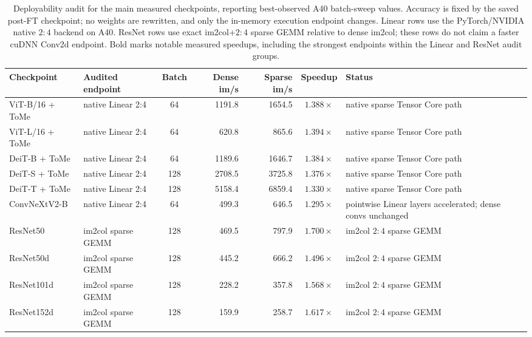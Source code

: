 \documentclass[11pt]{article}
\theoremstyle{plain}
\theoremstyle{definition}
\theoremstyle{remark}
\newcommand{\1}{\mathbf{1}}
\begin{document}
\begin{table}[H]
\centering
\caption{Deployability audit for the main measured checkpoints, reporting best-observed A40 batch-sweep values. Accuracy is fixed by the saved post-FT checkpoint; no weights are rewritten, and only the in-memory execution endpoint changes. Linear rows use the PyTorch/NVIDIA native \(2{:}4\) backend on A40. ResNet rows use exact im2col+\(2{:}4\) sparse GEMM relative to dense im2col; these rows do not claim a faster cuDNN Conv2d endpoint. Bold marks notable measured speedups, including the strongest endpoints within the Linear and ResNet audit groups.}
\label{tab:deployability_audit_compact}
\scriptsize
\setlength{\tabcolsep}{2.1pt}
\renewcommand{\arraystretch}{1.05}
\begin{tabularx}{\textwidth}{l l c r r c X}
\toprule
Checkpoint & Audited endpoint & Batch & Dense im/s & Sparse im/s & Speedup & Status \\
\midrule
ViT-B/16 + ToMe & native Linear 2:4 & 64 & 1191.8 & 1654.5 & \(\mathbf{1.388\times}\) & native sparse Tensor Core path \\
ViT-L/16 + ToMe & native Linear 2:4 & 64 & 620.8 & 865.6 & \(\mathbf{1.394\times}\) & native sparse Tensor Core path \\
DeiT-B + ToMe & native Linear 2:4 & 64 & 1189.6 & 1646.7 & \(1.384\times\) & native sparse Tensor Core path \\
DeiT-S + ToMe & native Linear 2:4 & 128 & 2708.5 & 3725.8 & \(1.376\times\) & native sparse Tensor Core path \\
DeiT-T + ToMe & native Linear 2:4 & 128 & 5158.4 & 6859.4 & \(1.330\times\) & native sparse Tensor Core path \\
ConvNeXtV2-B & native Linear 2:4 & 64 & 499.3 & 646.5 & \(1.295\times\) & pointwise Linear layers accelerated; dense convs unchanged \\
ResNet50 & im2col sparse GEMM & 128 & 469.5 & 797.9 & \(\mathbf{1.700\times}\) & im2col \(2{:}4\) sparse GEMM \\
ResNet50d & im2col sparse GEMM & 128 & 445.2 & 666.2 & \(\mathbf{1.496\times}\) & im2col \(2{:}4\) sparse GEMM \\
ResNet101d & im2col sparse GEMM & 128 & 228.2 & 357.8 & \(\mathbf{1.568\times}\) & im2col \(2{:}4\) sparse GEMM \\
ResNet152d & im2col sparse GEMM & 128 & 159.9 & 258.7 & \(\mathbf{1.617\times}\) & im2col \(2{:}4\) sparse GEMM \\
\bottomrule
\end{tabularx}
\end{table}
\end{document}
